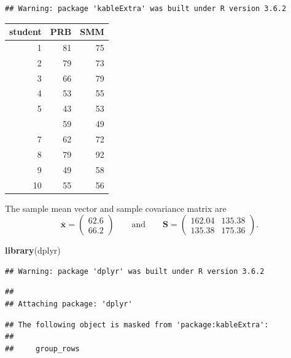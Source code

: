 \documentclass[]{book}
\newenvironment{Shaded}{\begin{snugshade}}{\end{snugshade}}
\newcommand{\KeywordTok}[1]{\textcolor[rgb]{0.13,0.29,0.53}{\textbf{#1}}}
\newcommand{\NormalTok}[1]{#1}
\theoremstyle{definition}
\theoremstyle{definition}
\theoremstyle{definition}
\theoremstyle{remark}
\begin{document}
\begin{verbatim}
## Warning: package 'kableExtra' was built under R version 3.6.2
\end{verbatim}

\begin{table}[H]
\centering
\begin{tabular}{rrr}
\toprule
student & PRB & SMM\\
\midrule
1 & 81 & 75\\
2 & 79 & 73\\
3 & 66 & 79\\
4 & 53 & 55\\
5 & 43 & 53\\
\addlinespace
6 & 59 & 49\\
7 & 62 & 72\\
8 & 79 & 92\\
9 & 49 & 58\\
10 & 55 & 56\\
\bottomrule
\end{tabular}
\end{table}

The sample mean vector and sample covariance matrix are
\[
\bar{\boldsymbol x} = \begin{pmatrix} 62.6 \\ 66.2 \end{pmatrix}\qquad \text{and} \qquad \boldsymbol S= \begin{pmatrix} 162.04 & 135.38 \\ 135.38 & 175.36 \end{pmatrix}.
\]

\begin{Shaded}
\begin{Highlighting}[]
\KeywordTok{library}\NormalTok{(dplyr)}
\end{Highlighting}
\end{Shaded}

\begin{verbatim}
## Warning: package 'dplyr' was built under R version 3.6.2
\end{verbatim}

\begin{verbatim}
## 
## Attaching package: 'dplyr'
\end{verbatim}

\begin{verbatim}
## The following object is masked from 'package:kableExtra':
## 
##     group_rows
\end{verbatim}
\end{document}
